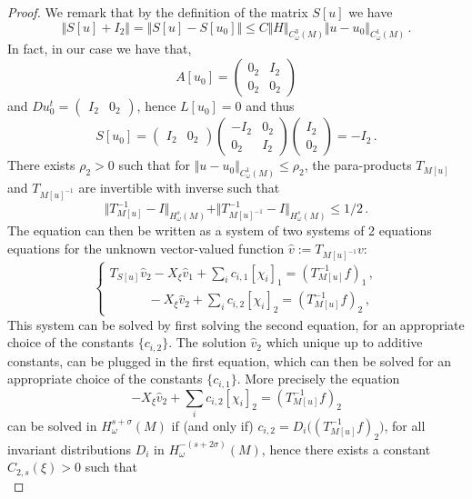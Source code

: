\documentclass[11pt]{amsart}
\begin{document}
\begin{proof}
We remark that by the definition of the matrix $S[u]$ we have
$$
\Vert S[u]  +I_2\Vert = \Vert S[u] - S[u_0] \Vert \leq C \Vert H \Vert_{C^3_\omega(M)} \Vert u-u_0 \Vert_{C^1_\omega(M)} \,.
$$
In fact, in our case we have that, 
$$
A[u_0] = \begin{pmatrix}   0_2   &   I_2 \\  0_2 & 0_2  \end{pmatrix} 
$$
and $Du_0^t =\begin{pmatrix} I_2& 0_2 \end{pmatrix}$, hence $L[u_0] =0$ and thus
$$
S[u_0] = \begin{pmatrix}  I_2 & 0_2 \end{pmatrix} \begin{pmatrix}   -I_2   &   0_2 \\  0_2 & I_2  \end{pmatrix}    \begin{pmatrix}  I_2 \\ 0_2 \end{pmatrix} = -I_2\,. 
$$
There exists $\rho_2>0$ such that for $\Vert u-u_0 \Vert_{C^1_\omega(M)} \leq \rho_2$, the para-products  $T_{M[u]}$ and $T_{M[u]^{-1}}$ are invertible with inverse 
such that 
$$  \Vert T^{-1}_{M[u]} -I \Vert_{H^s_\omega(M)} +  \Vert T^{-1}_{M[u]^{-1}} -I \Vert_{H^s_\omega(M)}   \leq 1/2\,.
$$
The equation can then be written as a system of two systems of 2 equations equations for the unknown vector-valued function 
$\hat v := T_{M[u]^{-1}}  v$:
$$
\begin{cases}  
T_{S[u]}  \hat v_2 -  X_\xi \hat v_1  + \sum_i  c_{i,1} [\chi_{i}]_1  =  (T^{-1}_{M[u]}  f )_1 \,, \\ \quad\quad \quad
-  X_\xi \hat v_2  + \sum_i  c_{i,2} [\chi_{i}]_2  =  (T^{-1}_{M[u]}  f )_2\,,
 \end{cases}
$$
This system can be solved by first solving the second equation, for an appropriate choice of the constants $\{c_{i,2}\}$. The solution
$\hat v_2$ which unique up to additive constants, can be plugged in the first equation, which can then be solved for an appropriate choice 
of the constants $\{c_{i,1}\}$.  More precisely the equation
$$
-  X_\xi \hat v_2  + \sum_i  c_{i,2} [\chi_{i}]_2  =  (T^{-1}_{M[u]}  f )_2
$$
can be solved in $H^{s+\sigma}_\omega(M)$  if (and only if) $c_{i,2} = D_i \Big( (T^{-1}_{M[u]}  f )_2\Big)$, for all invariant distributions 
$D_i$ in $H^{-(s+ 2\sigma)}_\omega(M)$, hence there exists a constant $C_{2,s}(\xi) >0$ such that 
$$
$$
\end{proof}
\end{document}
